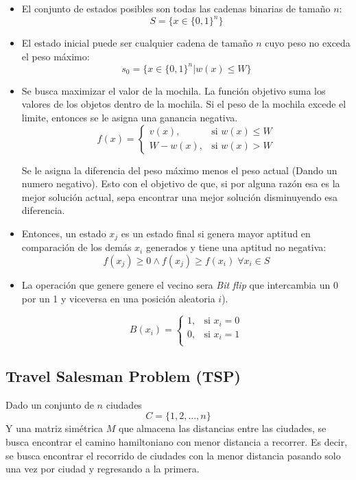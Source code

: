 \documentclass[12pt,twoside]{article}
\begin{document}
	\begin{itemize}
		\item El conjunto de estados posibles son todas las cadenas binarias de tamaño $n$: \[ S = \{ x \in \{ 0, 1  \}^n \} \]
		
		\item El estado inicial puede ser cualquier cadena de tamaño $n$ cuyo peso no exceda el peso máximo: \[ s_0 = \{x \in \{0,1\}^n | w(x) \leq W \} \]
				
		\item Se busca maximizar el valor de la mochila. La función objetivo suma los valores de los objetos dentro de la mochila. Si el peso de la mochila excede el limite, entonces se le asigna una ganancia negativa. 
		\[
		f(x) =
		\begin{cases} 
			v(x), & \text{si } w(x) \leq W \\ 
			W - w(x), & \text{si } w(x) > W
		\end{cases}
		\]
		
		Se le asigna la diferencia del peso máximo menos el peso actual (Dando un numero negativo). Esto con el objetivo de que, si por alguna razón esa es la mejor solución actual, sepa encontrar una mejor solución disminuyendo esa diferencia.
		
		\item Entonces, un estado $x_j$ es un estado final si genera mayor aptitud en comparación de los demás $x_i$ generados y tiene una aptitud no negativa: \[ f(x_j) \geq 0 \land f(x_j) \geq f(x_i) \; \forall x_i \in S\]
		
		\item La operación que genere genere el vecino sera \textit{Bit flip} que intercambia un 0 por un 1 y viceversa en una posición aleatoria $i$).
		
		\[
		B(x_i) =
		\begin{cases} 
			1, & \text{si } x_i = 0 \\ 
			0, & \text{si } x_i = 1 \\
		\end{cases}
		\]
		
		
	\end{itemize}
	
	\subsection{Travel Salesman Problem (TSP)}
	
	Dado un conjunto de $n$ ciudades \[ C = \{1,2, \dots , n\} \] Y una matriz simétrica $M$ que almacena las distancias entre las ciudades, se busca encontrar el camino hamiltoniano con menor distancia a recorrer. Es decir, se busca encontrar el recorrido de ciudades con la menor distancia pasando solo una vez por ciudad y regresando a la primera.
	
\end{document}
